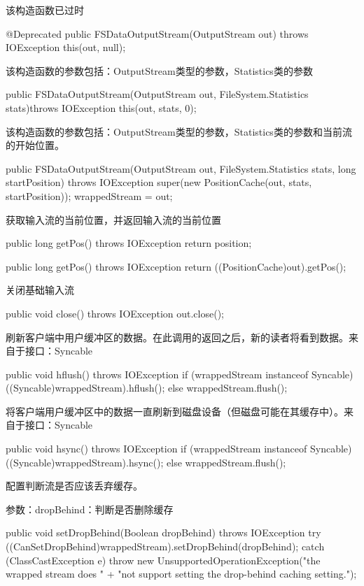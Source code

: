 该构造函数已过时
\begin{java}
@Deprecated
public FSDataOutputStream(OutputStream out) throws IOException {
	this(out, null);
}
\end{java}
该构造函数的参数包括：OutputStream类型的参数，Statistics类的参数
\begin{java}
public FSDataOutputStream(OutputStream out, FileSystem.Statistics stats)throws IOException {
	this(out, stats, 0);
}
\end{java}
该构造函数的参数包括：OutputStream类型的参数，Statistics类的参数和当前流的开始位置。
\begin{java}
public FSDataOutputStream(OutputStream out, FileSystem.Statistics stats,
		     long startPosition) throws IOException {
	super(new PositionCache(out, stats, startPosition));
	wrappedStream = out;
}
\end{java}
获取输入流的当前位置，并返回输入流的当前位置
\begin{java}
public long getPos() throws IOException {
	return position;
}

public long getPos() throws IOException {
	return ((PositionCache)out).getPos();
}
\end{java}
关闭基础输入流
\begin{java}
public void close() throws IOException {
	out.close(); 
}
\end{java}
刷新客户端中用户缓冲区的数据。在此调用的返回之后，新的读者将看到数据。来自于接口：Syncable
\begin{java}
public void hflush() throws IOException {
	if (wrappedStream instanceof Syncable) {
		((Syncable)wrappedStream).hflush();
    	} else {
      		wrappedStream.flush();
    }
}
\end{java}
将客户端用户缓冲区中的数据一直刷新到磁盘设备（但磁盘可能在其缓存中）。来自于接口：Syncable

\begin{java}
public void hsync() throws IOException {
	if (wrappedStream instanceof Syncable) {
      ((Syncable)wrappedStream).hsync();
	    } else {
      		wrappedStream.flush();
	}
}
\end{java}
配置判断流是否应该丢弃缓存。

参数：dropBehind：判断是否删除缓存

\begin{java}
public void setDropBehind(Boolean dropBehind) throws IOException {
	  try {
	    ((CanSetDropBehind)wrappedStream).setDropBehind(dropBehind);
	  } catch (ClassCastException e) {
	    throw new UnsupportedOperationException("the wrapped stream does " +
	        "not support setting the drop-behind caching setting.");
	  }
	}
\end{java}


